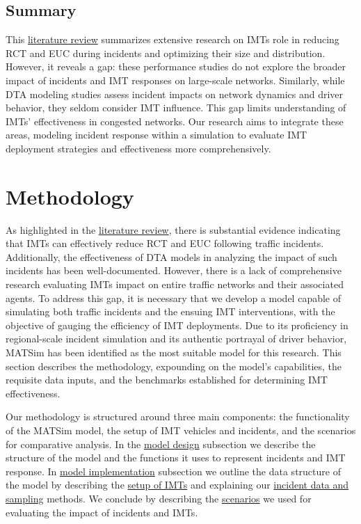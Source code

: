 \documentclass[fancy, oneside, mastersfancy, ms]{byuthesis}
\begin{document}
\hypertarget{sec-lit_summary}{%
\section{Summary}\label{sec-lit_summary}}

This \protect\hyperlink{sec-literature}{literature review} summarizes
extensive research on IMTs role in reducing RCT and EUC during incidents
and optimizing their size and distribution. However, it reveals a gap:
these performance studies do not explore the broader impact of incidents
and IMT responses on large-scale networks. Similarly, while DTA modeling
studies assess incident impacts on network dynamics and driver behavior,
they seldom consider IMT influence. This gap limits understanding of
IMTs' effectiveness in congested networks. Our research aims to
integrate these areas, modeling incident response within a simulation to
evaluate IMT deployment strategies and effectiveness more
comprehensively.


\hypertarget{sec-methods}{%
\chapter{Methodology}\label{sec-methods}}

As highlighted in the \protect\hyperlink{sec-literature}{literature
review}, there is substantial evidence indicating that IMTs can
effectively reduce RCT and EUC following traffic incidents.
Additionally, the effectiveness of DTA models in analyzing the impact of
such incidents has been well-documented. However, there is a lack of
comprehensive research evaluating IMTs impact on entire traffic networks
and their associated agents. To address this gap, it is necessary that
we develop a model capable of simulating both traffic incidents and the
ensuing IMT interventions, with the objective of gauging the efficiency
of IMT deployments. Due to its proficiency in regional-scale incident
simulation and its authentic portrayal of driver behavior, MATSim has
been identified as the most suitable model for this research. This
section describes the methodology, expounding on the model's
capabilities, the requisite data inputs, and the benchmarks established
for determining IMT effectiveness.

Our methodology is structured around three main components: the
functionality of the MATSim model, the setup of IMT vehicles and
incidents, and the scenarios for comparative analysis. In the
\protect\hyperlink{sec-MATSim_mod}{model design} subsection we describe
the structure of the model and the functions it uses to represent
incidents and IMT response. In \protect\hyperlink{sec-model_imp}{model
implementation} subsection we outline the data structure of the model by
describing the \protect\hyperlink{sec-IMT_setup}{setup of IMTs} and
explaining our \protect\hyperlink{sec-inc_data}{incident data and
sampling} methods. We conclude by describing the
\protect\hyperlink{sec-scenarios}{scenarios} we used for evaluating the
impact of incidents and IMTs.
\end{document}
